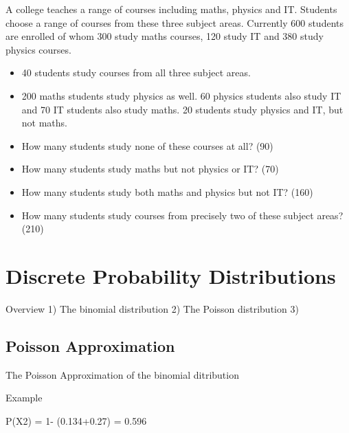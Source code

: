 \documentclass[12pt]{report}
\begin{document}


A college teaches a range of courses including maths, physics and IT.
Students choose a range of courses from these three subject areas. Currently 600
students are enrolled of whom 300 study maths courses, 120 study IT
and 380 study physics courses. 

\begin{itemize}
	\item 40 students study courses from all three subject
	areas. 
	\item 200 maths students study physics as well. 60 physics students
	also study IT and 70 IT students also study maths. 20 students study physics and IT, but not maths.
\end{itemize}



\begin{itemize}
	\item How many students study none of these courses at all? (90)
	
	\item How many students study maths but not physics or IT? (70)
	
	\item How many students study both maths and physics but not IT? (160)
	
	\item How many students study courses from precisely two of these subject
	areas? (210)
\end{itemize}


 		\chapter{Discrete Probability Distributions}
Overview
1) The binomial distribution
2) The Poisson distribution
3) 

\section{Poisson Approximation}
The Poisson Approximation of the binomial ditribution

Example

P(X2) = 1- (0.134+0.27) = 0.596
\end{document}
